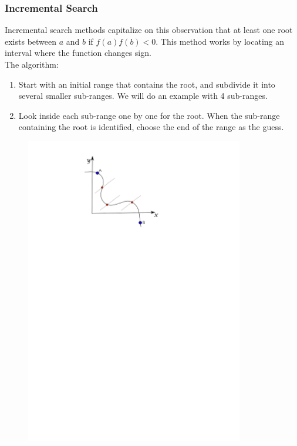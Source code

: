 \documentclass{if-beamer}
\begin{document}
\begin{frame}
\frametitle{Incremental Search}
Incremental search methods capitalize on this observation that at least one root exists between $a$ and $b$ if $f(a)f(b)<0$. This method works by locating an interval where the function changes sign.  \\
\vspace{0.25cm}
The algorithm:
\begin{enumerate}
	\item Start with an initial range that contains the root, and subdivide it into several smaller sub-ranges. We will do an example with 4 sub-ranges.
	\item Look inside each sub-range one by one for the root. When the sub-range containing the root is identified, choose the end of the range as the guess.
\end{enumerate}
\begin{figure}
	\centering
	\includegraphics[width = 0.85\textwidth]{figures/incremental1}
\end{figure}
\end{frame}
\end{document}
